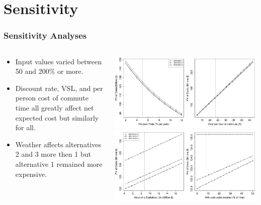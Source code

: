 \documentclass{beamer}
\begin{document}
\section{Sensitivity}
\begin{frame}
  \frametitle{Sensitivity Analyses}
  \begin{columns}
    \begin{column}{0.4\textwidth}
      \begin{itemize}
      \item Input values varied between 50 and 200\% or more.
      \item Discount rate, VSL, and per person cost of commute time
        all greatly affect net expected cost but similarly for all.
      \item Weather affects alternatives 2 and 3 more then 1 but
        alternative 1 remained more expensive.
      \end{itemize}
    \end{column}
    \begin{column}{0.65\textwidth}
      \centering
      \includegraphics[width=.9\textwidth]{../../R/sensitivity1}\\
      \includegraphics[width=.9\textwidth]{../../R/sensitivity2}
    \end{column}
  \end{columns}
\end{frame}
\end{document}

